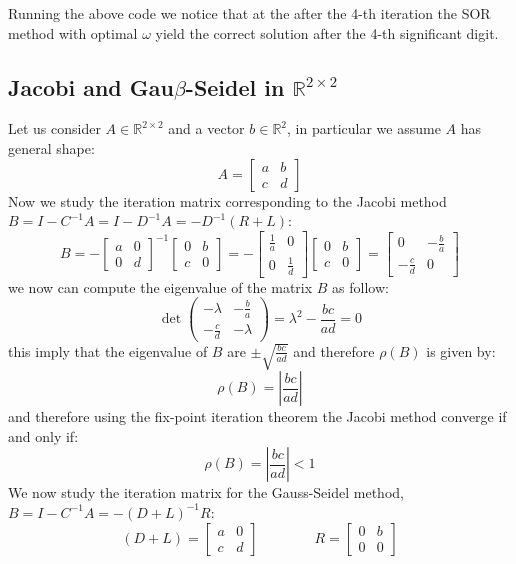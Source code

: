 \documentclass[11pt]{article}
\begin{document}
    Running the above code we notice that at the after the 4-th iteration
the SOR method with optimal \(\omega\) yield the correct solution after
the 4-th significant digit.

    \subsection{\texorpdfstring{Jacobi and Gau\(\beta\)-Seidel in
\(\mathbb{R}^{2\times 2}\)}{Jacobi and Gau\textbackslash{}beta-Seidel in \textbackslash{}mathbb\{R\}\^{}\{2\textbackslash{}times 2\}}}\label{jacobi-and-gaubeta-seidel-in-mathbbr2times-2}

Let us consider \(A\in\mathbb{R}^{2\times 2}\) and a vector
\(b\in\mathbb{R}^{2}\), in particular we assume \(A\) has general shape:
\[ A = \begin{bmatrix} a & b \\ c & d \end{bmatrix}\] Now we study the
iteration matrix corresponding to the Jacobi method
\(B=I-C^{-1}A=I-D^{-1}A=-D^{-1}(R+L)\):
\[B=-\begin{bmatrix}a & 0\\0&d\end{bmatrix}^{-1}\begin{bmatrix}0 & b\\c & 0\end{bmatrix}=-\begin{bmatrix}\frac{1}{a} & 0\\0&\frac{1}{d}\end{bmatrix}\begin{bmatrix}0 & b\\c & 0\end{bmatrix}=\begin{bmatrix}0 & -\frac{b}{a}\\-\frac{c}{d} & 0\end{bmatrix}\]
we now can compute the eigenvalue of the matrix \(B\) as follow:
\[\det\begin{pmatrix}-\lambda & -\frac{b}{a}\\-\frac{c}{d} & -\lambda\end{pmatrix}=\lambda^2-\frac{bc}{ad}=0\]
this imply that the eigenvalue of \(B\) are \(\pm \sqrt{\frac{bc}{ad}}\)
and therefore \(\rho(B)\) is given by: \[\rho(B) = |\frac{bc}{ad}|\] and
therefore using the fix-point iteration theorem the Jacobi method
converge if and only if: \[\rho(B) = |\frac{bc}{ad}|<1\] We now study
the iteration matrix for the Gauss-Seidel method,
\(B=I-C^{-1}A=-(D+L)^{-1}R\):
\[ (D+L) = \begin{bmatrix} a & 0 \\ c & d \end{bmatrix}\qquad\qquad R = \begin{bmatrix} 0 & b \\ 0 & 0 \end{bmatrix}\]
\end{document}
